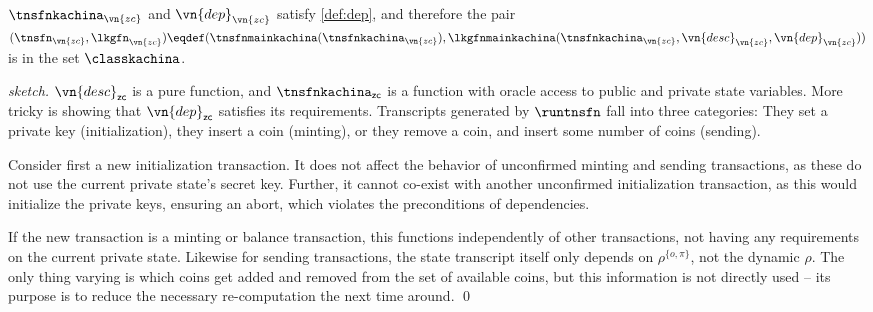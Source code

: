 \begin{lemma}
  $\tnsfnkachina_{\vn{zc}}$ and $\vn{dep}_\vn{zc}$ satisfy \autoref{def:dep},
  and therefore the pair $(\tnsfn_\vn{zc},\allowbreak \lkgfn_\vn{zc}) \eqdef
  (\tnsfnmainkachina(\tnsfnkachina_\vn{zc}),
  \lkgfnmainkachina(\tnsfnkachina_\vn{zc}, \vn{desc}_\vn{zc},\allowbreak \vn{dep}_\vn{zc}))$
  is in the set $\classkachina$.
\end{lemma}

\begin{proof}[sketch]
  $\vn{desc}_{\mathsf{zc}}$ is a pure function, and $\tnsfnkachina_{\mathsf{zc}}$ is
  a function with oracle access to public and private state variables. More
  tricky is showing that $\vn{dep}_{\mathsf{zc}}$ satisfies its requirements.
  Transcripts generated by $\runtnsfn$ fall into three categories:
  They set a private key (initialization), they insert a coin (minting), or they
  remove a coin, and insert some number of coins (sending).

  Consider first a new initialization transaction. It does not affect the
  behavior of unconfirmed minting and sending transactions, as these do not use
  the current private state's secret key. Further, it cannot co-exist with
  another unconfirmed initialization transaction, as this would initialize the
  private keys, ensuring an abort, which violates the preconditions of
  dependencies.

  If the new transaction is a minting or balance transaction, this
  functions independently of other transactions, not having any requirements on
  the current private state. Likewise for sending transactions, the state
  transcript itself only depends on $\rho^{\{o,\pi\}}$, not the dynamic
  $\rho$. The only thing varying is which coins get added and removed from
  the set of available coins, but this information is not directly used -- its purpose is to
  reduce the necessary re-computation the next time around.
  \qed
\end{proof}
%
